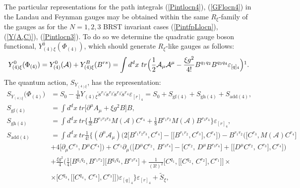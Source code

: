 \documentclass[10pt]{article}
\begin{document}
 The particular representations for the path integrals (\ref{Pintlocn4}), (\ref{GFlocn4}) in  the Landau and Feynman gauges may be  obtained within the same $R_\xi$-family of the gauges as for the $N=1,2,3$ BRST invariant cases  (\ref{PintfpLlocn}), (\ref{Y(A,C)}), (\ref{Pintlocn3}).
 To do so  we determine the quadratic gauge boson functional, $Y^0_{(4)\xi}({\Phi}_{(4)}) $,  which should generate $R_\xi$-like gauges as follows:
\begin{eqnarray}
 \label{gBn4xi} Y^0_{(4)\xi}({\Phi}_{(4)}) = Y^0_{(4)}(\mathcal{A})+Y^B_{(4)\xi}(B^{rs}) = \int
d^{d}x\ tr \Big(\frac{1}{2}\mathcal{ A}_{\mu }\mathcal{A}^{\mu }-\frac{\xi g^2 }{4!}B^{q_1q_2}B^{q_3q_4}\varepsilon_{[q]_4}\Big)\footnotemark . \end{eqnarray}
 The quantum action, $S_{Y_{(4)\xi}}$, has the representation:
\begin{align}\label{qexi4}
  S_{Y_{(4)\xi}}\big({\Phi}_{(4)}\big) & = S_0-\frac{1}{4!}%
Y_{(4)\xi}\overleftarrow{s}{}^{r_1}\overleftarrow{s}{}^{r_2}\overleftarrow{s}{}^{r_3}\overleftarrow{s}{}^{r_4} \varepsilon_{[r]_4}= S_0+S_{\mathrm{gf}(4)} +  S_{\mathrm{gh}(4)}+  S_{\mathrm{add}(4)} ,\\
 S_{\mathrm{gf}(4)} &  =  \int d^{d}x\ tr \Big[    \partial^{\mu}A_{\mu
}  + {\xi g^2} B\Big]  B,
\label{gfxi4}\\
   S_{\mathrm{gh}(4)}&  = \int d^{d}x\ tr \Big\{ %
  \frac{1}{3!} B^{r_1r_2r_3}M(\mathcal{A})  C^{r_4} + \frac{1}{8} B^{r_1r_2}M(\mathcal{A})  B^{r_3r_4}  \Big\}\varepsilon_{[r]_4}, \label{ghxi4}
 \end{align}
 \vspace{-1ex}
 \begin{align}
 S_{\mathrm{add}(4)} &=   \int d^{d}x\ tr   \frac{1}{4!}\Bigg\{
 (\partial^\mu\mathcal{ A}_{\mu })  \Big(2\big[B^{r_1r_2r_3}, C^{r_4}\big]  - \big[\big[B^{r_1r_2}, C^{r_3}\big], C^{r_4}\big]\Big) -  B^{r_1r_2}\Big(\big[ C^{r_3},  M(\mathcal{A})C^{r_4}\big]\nonumber \\
\phantom{S_{Y_{(4)\xi}}}&    +4\big[ \partial_\mu C^{r_3},  D^\mu C^{r_4}\big]\Big)+
 C^{r_1}\partial_\mu \Big( \big[D^\mu C^{r_2},\,    B^{r_3r_4}\big] -\big[C^{r_2},\, D^\mu B^{r_3r_4}   \big] + \big[\big[D^\mu C^{r_2},\, C^{r_3}\big],  C^{r_4}\big]\Big)\nonumber \\
\phantom{S_{Y_{(4)\xi}}\big({\Phi}_{(4)}\big)} &
+ \frac{{\xi g^2}}{4}\Big(\frac{1}{4}\big[B^{q_1q_2}, B^{r_1r_2}\big]
\big[B^{q_3q_4}, B^{r_3r_4}\big]   + \frac{1}{(3!)^2}\big[C^{q_1},\big[\big[C^{q_2},\,C^{r_2}\big] , C^{r_1}\big]\big]\times \nonumber\\
 \phantom{S_{Y_{(4)\xi}}\big({\Phi}_{(4)}\big)} &    \times \big[C^{q_3},\big[\big[C^{q_4},\,C^{r_4}\big] , C^{r_3}\big]\big]\Big)\varepsilon_{[q]_4} \Bigg\}\varepsilon_{[r]_4}+ \widetilde{S}_\xi,  \label{addxi4}
\end{align}
\end{document}
